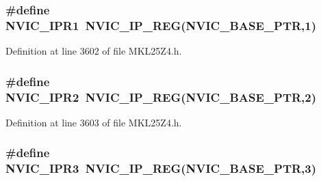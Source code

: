 \subsubsection[{\texorpdfstring{N\+V\+I\+C\+\_\+\+I\+P\+R1}{NVIC_IPR1}}]{\setlength{\rightskip}{0pt plus 5cm}\#define N\+V\+I\+C\+\_\+\+I\+P\+R1~{\bf N\+V\+I\+C\+\_\+\+I\+P\+\_\+\+R\+EG}({\bf N\+V\+I\+C\+\_\+\+B\+A\+S\+E\+\_\+\+P\+TR},1)}\hypertarget{group___n_v_i_c___register___accessor___macros_gaea31ee09a6c16a6000123d7b2285b9df}{}\label{group___n_v_i_c___register___accessor___macros_gaea31ee09a6c16a6000123d7b2285b9df}


Definition at line 3602 of file M\+K\+L25\+Z4.\+h.

\subsubsection[{\texorpdfstring{N\+V\+I\+C\+\_\+\+I\+P\+R2}{NVIC_IPR2}}]{\setlength{\rightskip}{0pt plus 5cm}\#define N\+V\+I\+C\+\_\+\+I\+P\+R2~{\bf N\+V\+I\+C\+\_\+\+I\+P\+\_\+\+R\+EG}({\bf N\+V\+I\+C\+\_\+\+B\+A\+S\+E\+\_\+\+P\+TR},2)}\hypertarget{group___n_v_i_c___register___accessor___macros_gae653779b3f436e52d1ecdd66bc855933}{}\label{group___n_v_i_c___register___accessor___macros_gae653779b3f436e52d1ecdd66bc855933}


Definition at line 3603 of file M\+K\+L25\+Z4.\+h.

\subsubsection[{\texorpdfstring{N\+V\+I\+C\+\_\+\+I\+P\+R3}{NVIC_IPR3}}]{\setlength{\rightskip}{0pt plus 5cm}\#define N\+V\+I\+C\+\_\+\+I\+P\+R3~{\bf N\+V\+I\+C\+\_\+\+I\+P\+\_\+\+R\+EG}({\bf N\+V\+I\+C\+\_\+\+B\+A\+S\+E\+\_\+\+P\+TR},3)}\hypertarget{group___n_v_i_c___register___accessor___macros_gac33f3f5d21cbb95316076b1b288387ac}{}\label{group___n_v_i_c___register___accessor___macros_gac33f3f5d21cbb95316076b1b288387ac}


